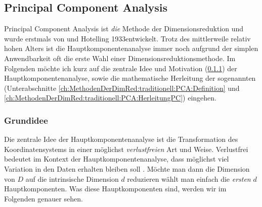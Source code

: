 \subsection{Principal Component Analysis}
\label{ch:MethodenDerDimRed:traditionell:PCA}

Principal Component Analysis ist \textit{die} Methode der Dimensionsreduktion und wurde erstmals von \textcite{Pearson.1901} und Hotelling 1933\addref entwickelt. Trotz des mittlerweile relativ hohen Alters ist die Hauptkomponentenanalyse immer noch aufgrund der simplen Anwendbarkeit oft die erste Wahl einer Dimensionsreduktionsmethode. Im Folgenden möchte ich kurz auf die zentrale Idee und Motivation (\ref{ch:MethodenDerDimRed:traditionell:PCA:Grundidee}) der Hauptkomponentenanalyse, sowie die mathematische Herleitung der sogenannten  (Unterabschnitte \ref{ch:MethodenDerDimRed:traditionell:PCA:Definition} und \ref{ch:MethodenDerDimRed:traditionell:PCA:HerleitungPC}) eingehen.


\subsubsection{Grundidee}
\label{ch:MethodenDerDimRed:traditionell:PCA:Grundidee}
Die zentrale Idee der Hauptkomponentenanalyse ist die Transformation des Koordinatensystems in einer möglichst \textit{verlustfreien} Art und Weise. Verlustfrei bedeutet im Kontext der Hauptkomponentenanalyse, dass möglichst viel Variation in den Daten erhalten bleiben soll \parencite[vgl.][1]{Jolliffe.2002}. Möchte man dann die Dimension von $D$ auf die intrinsische Dimension $d$ reduzieren wählt man einfach die \textit{ersten} $d$ Hauptkomponenten. Was diese Hauptkomponenten sind, werden wir im Folgenden genauer sehen.

